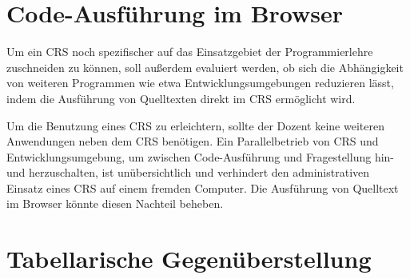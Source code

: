 \section{Code-Ausführung im Browser}
\label{chap:codeausfuehrung}
Um ein CRS noch spezifischer auf das Einsatzgebiet der Programmierlehre zuschneiden zu können, soll außerdem evaluiert werden, ob sich die Abhängigkeit von weiteren Programmen wie etwa Entwicklungsumgebungen reduzieren lässt, indem die Ausführung von Quelltexten direkt im CRS ermöglicht wird.

Um die Benutzung eines CRS zu erleichtern, sollte der Dozent keine weiteren Anwendungen neben dem CRS benötigen. Ein Parallelbetrieb von CRS und Entwicklungsumgebung, um zwischen Code-Ausführung und Fragestellung hin- und herzuschalten, ist unübersichtlich und verhindert den administrativen Einsatz eines CRS auf einem fremden Computer. Die Ausführung von Quelltext im Browser könnte diesen Nachteil beheben.

\newpage
\section{Tabellarische Gegenüberstellung}
\label{chap:tabelle}

